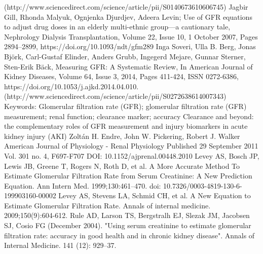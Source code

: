 \documentclass[10pt,final]{siamltex}
\begin{document}
\begin{thebibliography}{99}
(http://www.sciencedirect.com/science/article/pii/S0140673610606745)
Jagbir Gill, Rhonda Malyuk, Ognjenka Djurdjev, Adeera Levin; Use of GFR equations to adjust drug doses in an elderly multi-ethnic group—a cautionary tale, Nephrology Dialysis Transplantation, Volume 22, Issue 10, 1 October 2007, Pages 2894–2899, https://doi.org/10.1093/ndt/gfm289
Inga Soveri, Ulla B. Berg, Jonas Björk, Carl-Gustaf Elinder, Anders Grubb, Ingegerd Mejare, Gunnar Sterner, Sten-Erik Bäck, Measuring GFR: A Systematic Review, In American Journal of Kidney Diseases, Volume 64, Issue 3, 2014, Pages 411-424, ISSN 0272-6386, https://doi.org/10.1053/j.ajkd.2014.04.010.
(http://www.sciencedirect.com/science/article/pii/S0272638614007343)
Keywords: Glomerular filtration rate (GFR); glomerular filtration rate (GFR) measurement; renal function; clearance marker; accuracy
Clearance and beyond: the complementary roles of GFR measurement and injury biomarkers in acute kidney injury (AKI)
Zoltán H. Endre, John W. Pickering, Robert J. Walker
American Journal of Physiology - Renal Physiology Published 29 September 2011 Vol. 301 no. 4, F697-F707 DOI: 10.1152/ajprenal.00448.2010
Levey AS, Bosch JP, Lewis JB, Greene T, Rogers N, Roth D, et al. A More Accurate Method To Estimate Glomerular Filtration Rate from Serum Creatinine: A New Prediction Equation. Ann Intern Med. 1999;130:461–470. doi: 10.7326/0003-4819-130-6-199903160-00002
Levey AS, Stevens LA, Schmid CH, et al. A New Equation to Estimate Glomerular Filtration Rate. Annals of internal medicine. 2009;150(9):604-612.
Rule AD, Larson TS, Bergstralh EJ, Slezak JM, Jacobsen SJ, Cosio FG (December 2004). "Using serum creatinine to estimate glomerular filtration rate: accuracy in good health and in chronic kidney disease". Annals of Internal Medicine. 141 (12): 929–37.


\end{thebibliography}
\end{document}
